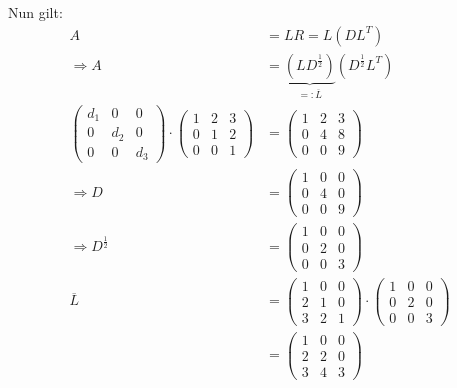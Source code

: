 Nun gilt:
\begin{align}
    A &= LR = L (DL^T)\\
\Rightarrow A &= \underbrace{(L D^\frac{1}{2})}_{=: \overline{L}} (D^\frac{1}{2} L^T)\\
    \begin{pmatrix}d_1 &0&0\\0&d_2&0\\0&0&d_3\end{pmatrix} \cdot
\begin{pmatrix}
        1 & 2 & 3\\
        0 & 1 & 2\\
        0 & 0 & 1
    \end{pmatrix}
 &= \begin{pmatrix}
        1 & 2 & 3\\
        0 & 4 & 8\\
        0 & 0 & 9
    \end{pmatrix}\\
\Rightarrow D &= \begin{pmatrix}1 &0&0\\0&4&0\\0&0&9\end{pmatrix}\\
\Rightarrow D^\frac{1}{2} &= \begin{pmatrix}1 &0&0\\0&2&0\\0&0&3\end{pmatrix}\\
\overline{L} &= \begin{pmatrix}
        1 & 0 & 0\\
        2 & 1 & 0\\
        3 & 2 & 1
    \end{pmatrix} \cdot \begin{pmatrix}1 &0&0\\0&2&0\\0&0&3\end{pmatrix}\\
    &= \begin{pmatrix}
        1 & 0 & 0\\
        2 & 2 & 0\\
        3 & 4 & 3
    \end{pmatrix}
\end{align}
